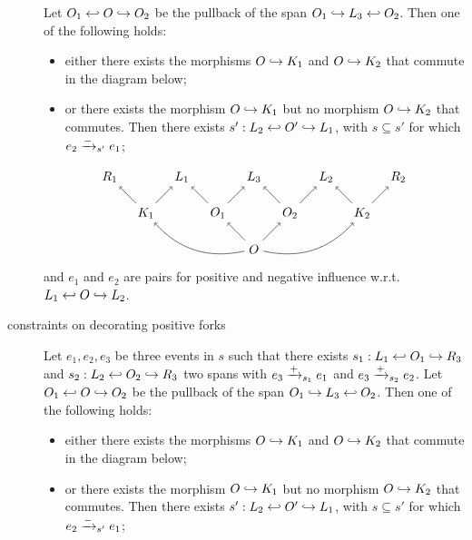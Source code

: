 \begin{definition}
\begin{description}
    Let $O_1\hookleftarrow O\hookrightarrow O_2$ be the pullback of the span $O_1\hookrightarrow L_3 \hookleftarrow O_2$. Then one of the following holds:
    \begin{itemize}
    \item either there exists the morphisms $O\hookrightarrow K_1$ and $O\hookrightarrow K_2$ that commute in the diagram below;
    \item or there exists the morphism $O\hookrightarrow K_1$ but no morphism $O\hookrightarrow K_2$ that commutes. Then there exists $s':L_2\hookleftarrow O'\hookrightarrow L_1$, with $s\subseteq s'$ for which $e_2\mathrel{\xrightarrow{-}}_{s'} e_1$; %
    \end{itemize}
   \[
    \begin{tikzpicture} %
      \node (o) at (0,-1) {\(O\)};
      \node (r3) at (0,1) {\(L_3\)};
      \node (o1) at (-1,0) {\(O_1\)};
      \node (o2) at (1,0) {\(O_2\)};
      \node (r1) at (-2,1) {\(L_1\)};
      \node (r2) at (2,1) {\(L_2\)};
      \node (l1) at (-4,1) {\(R_1\)};
      \node (l2) at (4,1) {\(R_2\)};
      \node (k1) at (-3,0) {\(K_1\)};
      \node (k2) at (3,0) {\(K_2\)};
      \draw [->] (o) -- (o1);
      \draw [->] (o) -- (o2);
      \draw [->] (o1) -- (r3);
      \draw [->] (o2) -- (r3);
      \draw [->] (o1) -- (r1);
      \draw [->] (o2) -- (r2);
      \draw [->] (k1) -- (r1);
      \draw [->] (k2) -- (r2);
      \draw [->] (k1) -- (l1);
      \draw [->] (k2) -- (l2);
      \draw [->] (o) to [bend left] (k1);
      \draw [->] (o) to [bend right] (k2);
    \end{tikzpicture}
    \]
    and $e_1$ and $e_2$ are pairs for positive and negative influence w.r.t. $L_1\hookleftarrow O\hookrightarrow L_2$.
  \item[constraints on decorating positive forks]
    Let $e_1,e_2,e_3$ be three events in $s$ such that there exists $s_1:L_1\hookleftarrow O_1\hookrightarrow R_3$ and $s_2:L_2\hookleftarrow O_2\hookrightarrow R_3$ two spans with $e_3\mathrel{\xrightarrow{+}}_{s_1} e_1$ and $e_3\mathrel{\xrightarrow{+}}_{s_2} e_2$.
    Let $O_1\hookleftarrow O\hookrightarrow O_2$ be the pullback of the span $O_1\hookrightarrow L_3 \hookleftarrow O_2$. Then one of the following holds:
    \begin{itemize}
    \item either there exists the morphisms $O\hookrightarrow K_1$ and $O\hookrightarrow K_2$ that commute in the diagram below;
    \item or there exists the morphism $O\hookrightarrow K_1$ but no morphism $O\hookrightarrow K_2$ that commutes. Then there exists $s':L_2\hookleftarrow O'\hookrightarrow L_1$, with $s\subseteq s'$ for which $e_2\mathrel{\xrightarrow{-}}_{s'} e_1$;

\end{itemize}
\end{description}
\end{definition}
